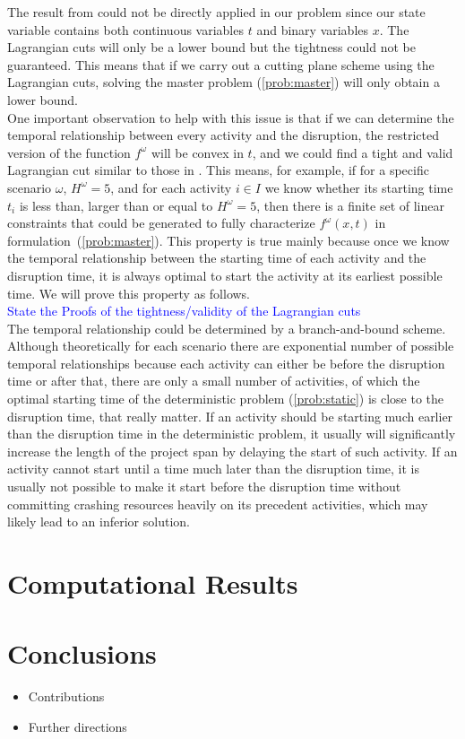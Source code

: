 \documentclass[11pt]{article}
\begin{document}
	The result from \cite{zou2016nested} could not be directly applied in our problem since our state variable contains both continuous variables \(t\) and binary variables \(x\). The Lagrangian cuts will only be a lower bound but the tightness could not be guaranteed. This means that if we carry out a cutting plane scheme using the Lagrangian cuts, solving the master problem (\ref{prob:master}) will only obtain a lower bound. \\
	\newline
	One important observation to help with this issue is that if we can determine the temporal relationship between every activity and the disruption, the restricted version of the function \(f^\omega\) will be convex in \(t\), and we could find a tight and valid Lagrangian cut similar to those in \cite{zou2016nested}. This means, for example, if for a specific scenario \(\omega\), \(H^\omega = 5\), and for each activity \(i \in I\) we know whether its starting time \(t_i\) is less than, larger than or equal to \(H^\omega = 5\), then there is a finite set of linear constraints that could be generated to fully characterize \(f^\omega(x,t)\) in formulation~(\ref{prob:master}). This property is true mainly because once we know the temporal relationship between the starting time of each activity and the disruption time, it is always optimal to start the activity at its earliest possible time. We will prove this property as follows. \\
	\newline
	\textcolor{blue}{State the Proofs of the tightness/validity of the Lagrangian cuts}\\
	\newline
	The temporal relationship could be determined by a branch-and-bound scheme. Although theoretically for each scenario there are exponential number of possible temporal relationships because each activity can either be before the disruption time or after that, there are only a small number of activities, of which the optimal starting time of the deterministic problem (\ref{prob:static}) is close to the disruption time, that really matter. If an activity should be starting much earlier than the disruption time in the deterministic problem, it usually will significantly increase the length of the project span by delaying the start of such activity. If an activity cannot start until a time much later than the disruption time, it is usually not possible to make it start before the disruption time without committing crashing resources heavily on its precedent activities, which may likely lead to an inferior solution.

\section{Computational Results} \label{sec:results}

\section{Conclusions} \label{sec:conclusions}
	\begin{itemize}
		\item Contributions
		\item Further directions
	\end{itemize}



\end{document}
